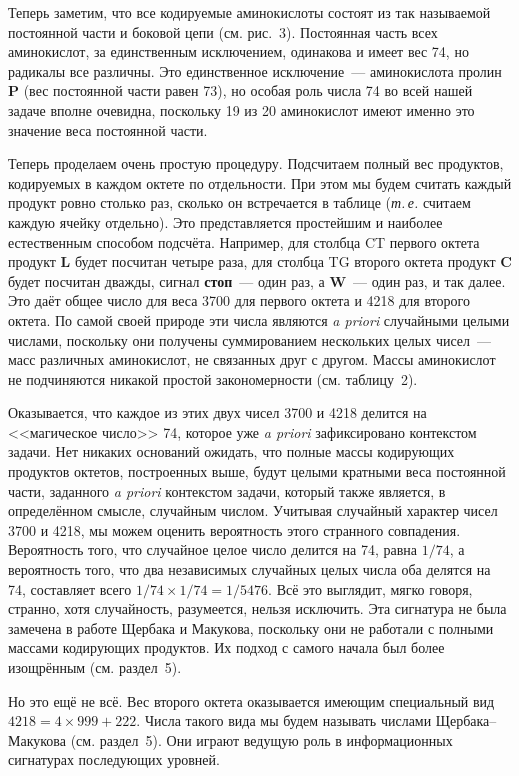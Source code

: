 \documentclass[12pt]{article}
\begin{document}
Теперь заметим, что все кодируемые аминокислоты состоят из так называемой постоянной части и боковой цепи (см. рис.~3). Постоянная часть всех аминокислот, за единственным исключением, одинакова и имеет вес 74, но радикалы все различны. Это единственное исключение~--- аминокислота пролин \textbf{P} (вес постоянной части равен 73), но особая роль числа 74 во всей нашей задаче вполне очевидна, поскольку 19 из 20 аминокислот имеют именно это значение веса постоянной части.

Теперь проделаем очень простую процедуру. Подсчитаем полный вес продуктов, кодируемых в каждом октете по отдельности. При этом мы будем считать каждый продукт ровно столько раз, сколько он встречается в таблице (\textit{т.\,е.} считаем каждую ячейку отдельно). Это представляется простейшим и наиболее естественным способом подсчёта. Например, для столбца CT первого октета продукт \textbf{L} будет посчитан четыре раза, для столбца TG второго октета продукт \textbf{C} будет посчитан дважды, сигнал \textbf{стоп}~--- один раз, а \textbf{W}~--- один раз, и так далее. Это даёт общее число для веса 3700 для первого октета и 4218 для второго октета. По самой своей природе эти числа являются \textit{a priori} случайными целыми числами, поскольку они получены суммированием нескольких целых чисел~--- масс различных аминокислот, не связанных друг с другом. Массы аминокислот не подчиняются никакой простой закономерности (см. таблицу~2).

Оказывается, что каждое из этих двух чисел 3700 и 4218 делится на <<магическое число>> 74, которое уже \textit{a priori} зафиксировано контекстом задачи. Нет никаких оснований ожидать, что полные массы кодирующих продуктов октетов, построенных выше, будут целыми кратными веса постоянной части, заданного \textit{a priori} контекстом задачи, который также является, в определённом смысле, случайным числом. Учитывая случайный характер чисел 3700 и 4218, мы можем оценить вероятность этого странного совпадения. Вероятность того, что случайное целое число делится на 74, равна $1/74$, а вероятность того, что два независимых случайных целых числа оба делятся на 74, составляет всего $1/74 \times 1/74 = 1/5476$. Всё это выглядит, мягко говоря, странно, хотя случайность, разумеется, нельзя исключить. Эта сигнатура не была замечена в работе Щербака и Макукова, поскольку они не работали с полными массами кодирующих продуктов. Их подход с самого начала был более изощрённым (см. раздел~5).

Но это ещё не всё. Вес второго октета оказывается имеющим специальный вид $4218 = 4 \times 999 + 222$. Числа такого вида мы будем называть числами Щербака--Макукова (см. раздел~5). Они играют ведущую роль в информационных сигнатурах последующих уровней.
\end{document}
